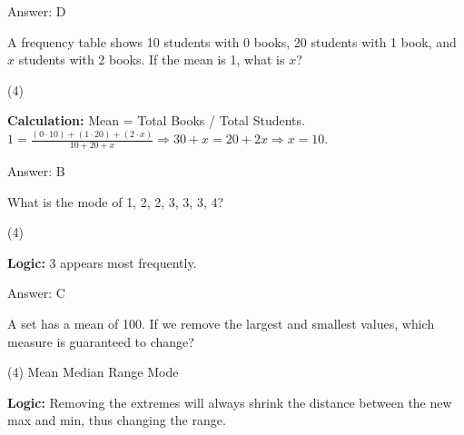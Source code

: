\documentclass[11pt,paper=a4,answers]{exam}
\begin{document}
\begin{questions}
\begin{solution}
\vspace{30pt}

Answer: \colorbox{yellow!100}{D}
\end{solution}

\vspace{60pt}

\question
A frequency table shows 10 students with 0 books, 20 students with 1 book, and $x$ students with 2 books. If the mean is 1, what is $x$?
\begin{tasks}(4)
\end{tasks}

\begin{solution}
\textbf{Calculation:} Mean = Total Books / Total Students.
$1 = \frac{(0\cdot10) + (1\cdot20) + (2\cdot x)}{10 + 20 + x} \Rightarrow 30 + x = 20 + 2x \Rightarrow x = 10$.

\vspace{30pt}

Answer: \colorbox{yellow!100}{B}
\end{solution}

\vspace{60pt}

\question
What is the mode of {1, 2, 2, 3, 3, 3, 4}?
\begin{tasks}(4)
\end{tasks}

\begin{solution}
\textbf{Logic:} 3 appears most frequently.

\vspace{30pt}

Answer: \colorbox{yellow!100}{C}
\end{solution}

\vspace{60pt}

\question
A set has a mean of 100. If we remove the largest and smallest values, which measure is guaranteed to change?
\begin{tasks}(4)
    \task Mean
    \task Median
    \task Range
    \task Mode
\end{tasks}

\begin{solution}
\textbf{Logic:} Removing the extremes will always shrink the distance between the new max and min, thus changing the range.


\end{solution}
\end{questions}
\end{document}
